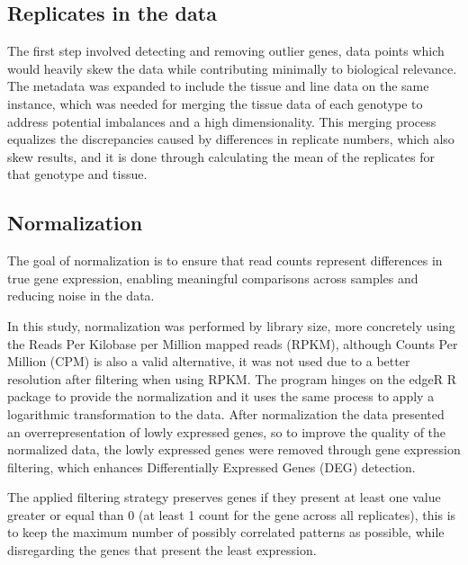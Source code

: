\documentclass[
]{article}
\begin{document}
\hypertarget{replicates-in-the-data}{%
\subsection{Replicates in the data}\label{replicates-in-the-data}}

The first step involved detecting and removing outlier genes, data
points which would heavily skew the data while contributing minimally to
biological relevance. The metadata was expanded to include the tissue
and line data on the same instance, which was needed for merging the
tissue data of each genotype to address potential imbalances and a high
dimensionality. This merging process equalizes the discrepancies caused
by differences in replicate numbers, which also skew results, and it is
done through calculating the mean of the replicates for that genotype
and tissue.

\hypertarget{normalization}{%
\subsection{Normalization}\label{normalization}}

The goal of normalization is to ensure that read counts represent
differences in true gene expression, enabling meaningful comparisons
across samples and reducing noise in the data.

In this study, normalization was performed by library size, more
concretely using the Reads Per Kilobase per Million mapped reads (RPKM),
although Counts Per Million (CPM) is also a valid alternative, it was
not used due to a better resolution after filtering when using RPKM. The
program hinges on the edgeR R package to provide the normalization and
it uses the same process to apply a logarithmic transformation to the
data. After normalization the data presented an overrepresentation of
lowly expressed genes, so to improve the quality of the normalized data,
the lowly expressed genes were removed through gene expression
filtering, which enhances Differentially Expressed Genes (DEG)
detection.

The applied filtering strategy preserves genes if they present at least
one value greater or equal than 0 (at least 1 count for the gene across
all replicates), this is to keep the maximum number of possibly
correlated patterns as possible, while disregarding the genes that
present the least expression.
\end{document}
